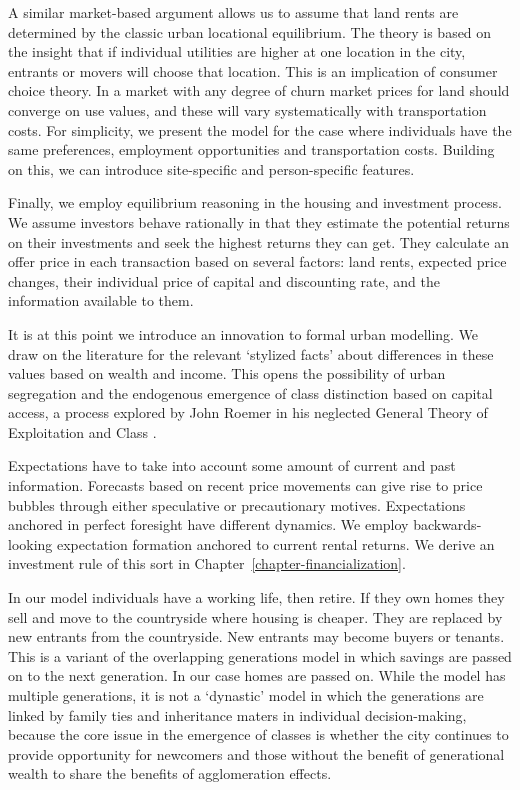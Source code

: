 A similar market-based argument allows us to assume that land rents are determined by the classic urban locational equilibrium. The theory is based on the insight that if individual utilities are higher at one location in the city, entrants or movers will choose that  location. This is an implication of consumer choice theory. In a market with any degree of churn market prices for land should converge on use values, and these will vary systematically with transportation costs. For simplicity, we present the model for the case where individuals have the same preferences, employment opportunities and transportation costs. Building on this, %
we can introduce site-specific and person-specific features. 

Finally, we employ equilibrium reasoning in the housing and investment process. We assume investors behave rationally in that they estimate the potential returns on their investments and seek the highest returns they can get. They calculate an offer price in each transaction based on several factors: land rents, expected price changes, their individual price of capital and discounting rate, and the information available to them.

It is at this point we introduce an innovation to formal urban modelling. We draw on the literature for the relevant `stylized facts' about differences in these values based on wealth and income. This opens the possibility of urban segregation and the endogenous emergence of class distinction based on capital access, a process explored by John Roemer in his neglected General Theory of Exploitation and Class \cite{Roemer}.  

Expectations have to take into account some amount of current and past information. Forecasts based on recent price movements can give rise to price bubbles through either speculative or precautionary motives. Expectations anchored in perfect foresight have different dynamics. We employ backwards-looking expectation formation anchored to current rental returns. We derive an investment rule of this sort in Chapter~\ref{chapter-financialization}. 
          
In our model individuals have a working life, then retire. If they own homes they sell and move to the countryside where housing is cheaper. They are replaced by new entrants from the countryside. New entrants may become buyers or tenants. This is a variant of the overlapping generations  model in which savings are passed on to the next generation. In our case homes are passed on. While the model has multiple generations, it is not a `dynastic' model in which the generations are linked by family ties and inheritance maters in individual decision-making, because the core issue in the emergence of classes is whether the city continues to provide opportunity for newcomers and those without the benefit of generational wealth to share the  benefits of agglomeration effects. %


